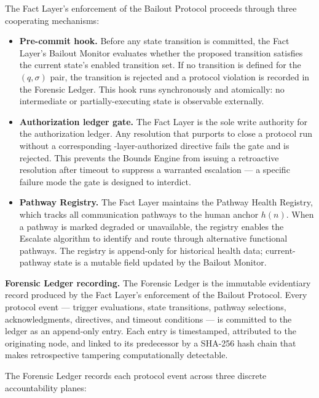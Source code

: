 The Fact Layer's enforcement of the Bailout Protocol proceeds through three cooperating mechanisms:

\begin{itemize}\itemsep=0pt
\item[(\textit{i})] \textbf{Pre-commit hook.} Before any state transition is committed, the Fact Layer's Bailout Monitor evaluates whether the proposed transition satisfies the current state's enabled transition set. If no transition is defined for the $(q, \sigma)$ pair, the transition is rejected and a protocol violation is recorded in the Forensic Ledger. This hook runs synchronously and atomically: no intermediate or partially-executing state is observable externally.

\item[(\textit{ii})] \textbf{Authorization ledger gate.} The Fact Layer is the sole write authority for the authorization ledger. Any resolution that purports to close a protocol run without a corresponding \purpose-layer-authorized directive fails the gate and is rejected. This prevents the Bounds Engine from issuing a retroactive resolution after timeout to suppress a warranted escalation --- a specific failure mode the gate is designed to interdict.

\item[(\textit{iii})] \textbf{Pathway Registry.} The Fact Layer maintains the Pathway Health Registry, which tracks all communication pathways to the human anchor $h(n)$. When a pathway is marked degraded or unavailable, the registry enables the Escalate algorithm to identify and route through alternative functional pathways. The registry is append-only for historical health data; current-pathway state is a mutable field updated by the Bailout Monitor.
\end{itemize}

\bigskip
\noindent\textbf{Forensic Ledger recording.} The Forensic Ledger is the immutable evidentiary record produced by the Fact Layer's enforcement of the Bailout Protocol. Every protocol event --- trigger evaluations, state transitions, pathway selections, acknowledgments, directives, and timeout conditions --- is committed to the ledger as an append-only entry. Each entry is timestamped, attributed to the originating node, and linked to its predecessor by a SHA-256 hash chain that makes retrospective tampering computationally detectable.

The Forensic Ledger records each protocol event across three discrete accountability planes:

